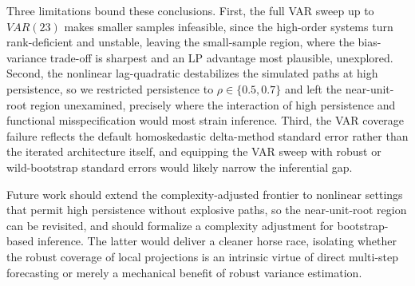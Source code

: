 Three limitations bound these conclusions. First, the full VAR sweep up to $VAR(23)$ makes smaller 
samples infeasible, since the high-order systems turn rank-deficient and unstable,
leaving the small-sample region, where the bias-variance trade-off is sharpest and an LP advantage
most plausible, unexplored. Second, the nonlinear lag-quadratic destabilizes the simulated paths at
high persistence, so we restricted persistence to $\rho \in \{0.5, 0.7\}$ and left the
near-unit-root region unexamined, precisely where the interaction of high persistence and
functional misspecification would most strain inference. Third, the VAR coverage failure reflects
the default homoskedastic delta-method standard error rather than the iterated architecture itself,
and equipping the VAR sweep with robust or wild-bootstrap standard errors would likely narrow the
inferential gap.

Future work should extend the complexity-adjusted frontier to nonlinear settings that permit high
persistence without explosive paths, so the near-unit-root region can be revisited, and should
formalize a complexity adjustment for bootstrap-based inference. The latter would deliver a cleaner
horse race, isolating whether the robust coverage of local projections is an intrinsic virtue of
direct multi-step forecasting or merely a mechanical benefit of robust variance estimation.